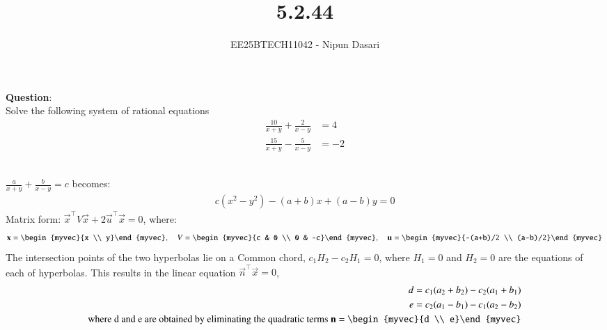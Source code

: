 \documentclass[journal]{IEEEtran}
\begin{document}
	
	
	\vspace{3cm}
	
	\title{5.2.44}
	\author{EE25BTECH11042 - Nipun Dasari}
	\maketitle
	
	\renewcommand{\thefigure}{\theenumi}
	\renewcommand{\thetable}{\theenumi}
	\setlength{\intextsep}{10pt}
	
	\renewcommand{\thetable}{\theenumi}
	
	\textbf{Question}:\\
	Solve the following system of rational equations
	\begin{align}
		\frac{10}{x+y}+\frac{2}{x-y} &= 4 \\
		\frac{15}{x+y}-\frac{5}{x-y} &= -2
	\end{align}
	
	\solution \\
	 $\frac{a}{x+y} + \frac{b}{x-y} = c$ becomes:
	\begin{align}
		c(x^2 - y^2) - (a+b)x + (a-b)y = 0 \label{eq:hyperbola_form}
	\end{align}
	Matrix form: $\vec{x}^\top V \vec{x} + 2\vec{u}^\top \vec{x} = 0$, where:
	\begin{align}
		\vec{x} = \begin{myvec}{x \\ y}\end{myvec}, \quad
		V = \begin{myvec}{c & 0 \\ 0 & -c}\end{myvec}, \quad
		\vec{u} = \begin{myvec}{-(a+b)/2 \\ (a-b)/2}\end{myvec} \label{eq:matrix_defs}
	\end{align}
	The intersection points of the two hyperbolas lie on a Common chord, $c_1H_2-c_2H_1=0$, where $H_1=0$ and $H_2=0$ are the equations of each of hyperbolas. This results in the linear equation $\vec{n}^\top\vec{x}=0$,
	\begin{align}
		d = c_1(a_2+b_2) - c_2(a_1+b_1) \label{eq:D_coeff} \\
		e = c_2(a_1-b_1) - c_1(a_2-b_2) \label{eq:E_coeff} \\
		\text{where d and e are obtained by eliminating the quadratic terms  } \vec{n} = \begin{myvec}{d \\ e}\end{myvec}
	\end{align}
	
\end{document}

